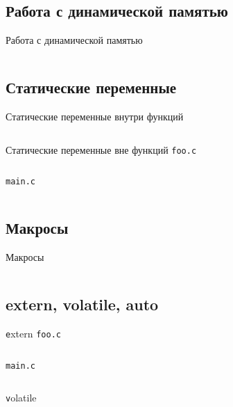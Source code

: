 \documentclass[handout]{beamer}
\begin{document}
\subsection{Работа с динамической памятью}
\begin{frame}{Работа с динамической памятью}
	\inputminted[linenos,bgcolor=listing,fontsize=\small]{C}{files/c_programming_langauge/malloc.c}
\end{frame}

\subsection{Статические переменные}
\begin{frame}{Статические переменные внутри функций}
	\inputminted[linenos,bgcolor=listing,fontsize=\small]{C}{files/c_programming_langauge/static.c}
\end{frame}

\begin{frame}{Статические переменные вне функций}
	\texttt{foo.c}
	\inputminted[linenos,bgcolor=listing,fontsize=\small]{C}{files/c_programming_langauge/static_foo.c}
	\texttt{main.c}
	\inputminted[linenos,bgcolor=listing,fontsize=\small]{C}{files/c_programming_langauge/static_main.c}	
\end{frame}

\subsection{Макросы}
\begin{frame}{Макросы}
	\inputminted[linenos,bgcolor=listing,fontsize=\small]{C}{files/c_programming_langauge/macros.c}
\end{frame}

\subsection{extern, volatile, auto}
\begin{frame}{\texttt extern}
	\texttt{foo.c}
	\inputminted[linenos,bgcolor=listing,fontsize=\small]{C}{files/c_programming_langauge/extern_foo.c}
	\texttt{main.c}
	\inputminted[linenos,bgcolor=listing,fontsize=\small]{C}{files/c_programming_langauge/extern_main.c}
\end{frame}
	
\begin{frame}{\texttt volatile}
	\inputminted[linenos,bgcolor=listing,fontsize=\small]{C}{files/c_programming_langauge/volatile.c}
\end{frame}
\end{document}
